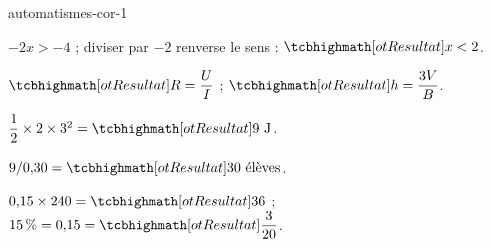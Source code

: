 \begin{blocEdition}{automatismes-cor-1}
\begin{deuxcolonnes}
\begin{questions}
\item \begin{minipage}[t]{\linewidth}\raggedright\leavevmode {}\enspace $-2x>-4$ ; diviser par $-2$ renverse le sens : $\res{x<2}$.\end{minipage}
\item \begin{minipage}[t]{\linewidth}\raggedright\leavevmode {}\enspace $\res{R=\dfrac UI}$ ; $\res{h=\dfrac{3V}B}$.\end{minipage}
\item \begin{minipage}[t]{\linewidth}\raggedright\leavevmode {}\enspace $\dfrac12\times2\times3^2=\res{9\text{ J}}$.\end{minipage}
\item \begin{minipage}[t]{\linewidth}\raggedright\leavevmode {}\enspace $9/0{,}30=\res{30\text{ élèves}}$.\end{minipage}
\item \begin{minipage}[t]{\linewidth}\raggedright\leavevmode {}\enspace $0{,}15\times240=\res{36}$ ; $15\,\%=0{,}15=\res{\dfrac3{20}}$.\end{minipage}
\end{questions}\end{deuxcolonnes}

\end{blocEdition}
